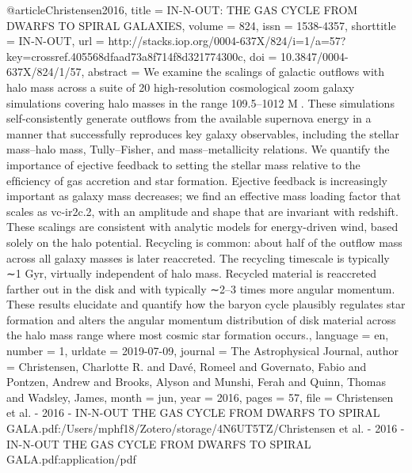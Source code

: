 {@article{Christensen2016,
	title = {{IN}-{N}-{OUT}: {THE} {GAS} {CYCLE} {FROM} {DWARFS} {TO} {SPIRAL} {GALAXIES}},
	volume = {824},
	issn = {1538-4357},
	shorttitle = {{IN}-{N}-{OUT}},
	url = {http://stacks.iop.org/0004-637X/824/i=1/a=57?key=crossref.405568dfaad73a8f714f8d321774300c},
	doi = {10.3847/0004-637X/824/1/57},
	abstract = {We examine the scalings of galactic outﬂows with halo mass across a suite of 20 high-resolution cosmological zoom galaxy simulations covering halo masses in the range 109.5–1012 M. These simulations self-consistently generate outﬂows from the available supernova energy in a manner that successfully reproduces key galaxy observables, including the stellar mass–halo mass, Tully–Fisher, and mass–metallicity relations. We quantify the importance of ejective feedback to setting the stellar mass relative to the efﬁciency of gas accretion and star formation. Ejective feedback is increasingly important as galaxy mass decreases; we ﬁnd an effective mass loading factor that scales as vc-ir2c.2, with an amplitude and shape that are invariant with redshift. These scalings are consistent with analytic models for energy-driven wind, based solely on the halo potential. Recycling is common: about half of the outﬂow mass across all galaxy masses is later reaccreted. The recycling timescale is typically ∼1 Gyr, virtually independent of halo mass. Recycled material is reaccreted farther out in the disk and with typically ∼2–3 times more angular momentum. These results elucidate and quantify how the baryon cycle plausibly regulates star formation and alters the angular momentum distribution of disk material across the halo mass range where most cosmic star formation occurs.},
	language = {en},
	number = {1},
	urldate = {2019-07-09},
	journal = {The Astrophysical Journal},
	author = {Christensen, Charlotte R. and Davé, Romeel and Governato, Fabio and Pontzen, Andrew and Brooks, Alyson and Munshi, Ferah and Quinn, Thomas and Wadsley, James},
	month = jun,
	year = {2016},
	pages = {57},
	file = {Christensen et al. - 2016 - IN-N-OUT THE GAS CYCLE FROM DWARFS TO SPIRAL GALA.pdf:/Users/mphf18/Zotero/storage/4N6UT5TZ/Christensen et al. - 2016 - IN-N-OUT THE GAS CYCLE FROM DWARFS TO SPIRAL GALA.pdf:application/pdf}
}


}
